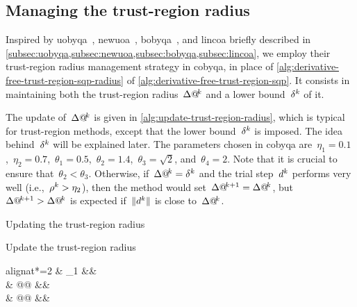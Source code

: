 \subsection{Managing the trust-region radius}
\label{subsec:managing-trust-region-radius}

Inspired by \gls{uobyqa}~\cite{Powell_2002}, \gls{newuoa}~\cite{Powell_2006}, \gls{bobyqa}~\cite{Powell_2009}, and \gls{lincoa} briefly described in \cref{subsec:uobyqa,subsec:newuoa,subsec:bobyqa,subsec:lincoa}, we employ their trust-region radius management strategy in \gls{cobyqa}, in place of \cref{alg:derivative-free-trust-region-sqp-radius} of \cref{alg:derivative-free-trust-region-sqp}.
It consists in maintaining both the trust-region radius~$\rad[k]$ and a lower bound~$\radlb[k]$ of it.

The update of~$\rad[k]$ is given in \cref{alg:update-trust-region-radius}, which is typical for trust-region methods, except that the lower bound~$\radlb[k]$ is imposed.
The idea behind~$\radlb[k]$ will be explained later.
The parameters chosen in \gls{cobyqa} are~$\eta_1 = 0.1$,~$\eta_2 = 0.7$,~$\theta_1 = 0.5$,~$\theta_2 = 1.4$,~$\theta_3 = \sqrt{2}$, and~$\theta_4 = 2$.
Note that it is crucial to ensure that~$\theta_2 < \theta_3$.
Otherwise, if~$\rad[k] = \radlb[k]$ and the trial step~$\step[k]$ performs very well (i.e.,~$\ratio[k] > \eta_2$), then the method would set~$\rad[k + 1] = \rad[k]$, but~$\rad[k + 1] > \rad[k]$ is expected if~$\norm{\step[k]}$ is close to~$\rad[k]$.

\begin{algorithm}
    \caption{Updating the trust-region radius}
    \label{alg:update-trust-region-radius}
    \DontPrintSemicolon
    \onehalfspacing
    Update the trust-region radius
    \begin{algoempheq}[left={\rad[k + 1] \gets \empheqlbrace}]{alignat*=2}
        & \theta_1 \rad[k]                                                                      && \quad {}\\
        & \max @@ \set{\theta_1 \rad[k], \norm{\step[k]}}                                          && \quad {}\\
        & \min @@     && \quad {}
    \end{algoempheq}
    \If{$\rad[k + 1] \le \theta_2 \radlb[k]$}{
        $\rad[k + 1] \gets \radlb[k]$\;
    }
\end{algorithm}

